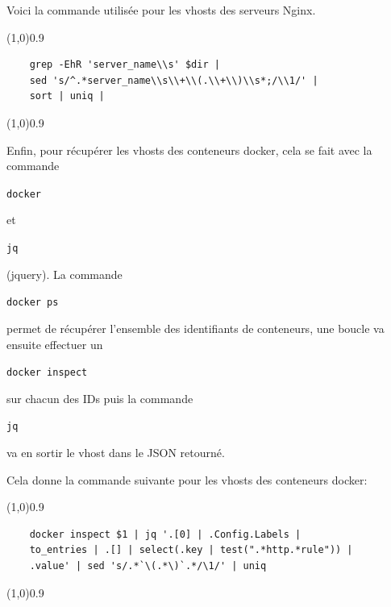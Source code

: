 \documentclass[12pt, a4paper, twoside]{article}
\begin{document}
Voici la commande utilisée pour les vhosts des serveurs Nginx.
\vspace{-1ex}
\begin{code}
\vspace{-1ex}
\begin{center} 
    \line(1,0){0.9\textwidth} 
\end{center}
\vspace{-1ex}
\begin{verbatim}
    grep -EhR 'server_name\\s' $dir | 
    sed 's/^.*server_name\\s\\+\\(.\\+\\)\\s*;/\\1/' |
    sort | uniq |
\end{verbatim}
    \vspace{-1ex}
\begin{center} 
    \line(1,0){0.9\textwidth} 
\end{center}
\end{code}

Enfin, pour récupérer les vhosts des conteneurs docker, cela se fait avec la commande \begin{code}\texttt{docker}\end{code} et \begin{code}\texttt{jq}\end{code} (jquery).
La commande \begin{code}\texttt{docker ps}\end{code} permet de récupérer l'ensemble des identifiants de conteneurs, une boucle va ensuite effectuer un \begin{code} \texttt{docker inspect}\end{code} sur chacun des IDs puis la commande \begin{code} \texttt{jq}\end{code}  va en sortir le vhost dans le \gls{JSON} retourné.

Cela donne la commande suivante pour les vhosts des conteneurs docker:
\vspace{-1ex}
\begin{code}
\vspace{-1ex}
\begin{center} 
    \line(1,0){0.9\textwidth} 
\end{center}
\vspace{-1ex}
\begin{verbatim}
    docker inspect $1 | jq '.[0] | .Config.Labels |
    to_entries | .[] | select(.key | test(".*http.*rule")) |
    .value' | sed 's/.*`\(.*\)`.*/\1/' | uniq
\end{verbatim}
\vspace{-1ex}
\begin{center} 
    \line(1,0){0.9\textwidth} 
\end{center}
\end{code}
\end{document}
